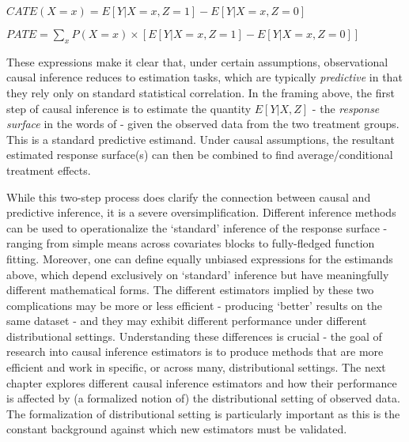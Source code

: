 \documentclass[../main.tex]{subfiles}
\begin{document}
\vspace{\baselineskip}
\begin{adjustwidth}{0.5in}{0.0in}
 \( CATE \left( X=x \right)  = E \left[ Y  \vert  X=x, Z=1 \right]  - E \left[ Y  \vert  X=x, Z=0 \right]  \) \par

\end{adjustwidth}


\vspace{\baselineskip}
\begin{adjustwidth}{0.5in}{0.0in}
 \( PATE =  \sum _{x}^{}P \left( X=x \right)   \times  \left[  E \left[ Y  \vert  X=x, Z=1 \right]  - E \left[ Y  \vert  X=x, Z=0 \right]   \right] _{} \) \par

\end{adjustwidth}


\vspace{\baselineskip}
These expressions make it clear that, under certain assumptions, observational causal inference reduces to estimation tasks, which are typically \textit{predictive }in that they rely only on standard statistical correlation. In the framing above, the first step of causal inference is to estimate the quantity \( E \left[ Y  \vert  X, Z \right]  \)  - the \textit{response surface} in the words of \textcite{Hill2011BayesianInference} - given the observed data from the two treatment groups. This is a standard predictive estimand. Under causal assumptions, the resultant estimated response surface(s) can then be combined to find average/conditional treatment effects.\par


\vspace{\baselineskip}
While this two-step process does clarify the connection between causal and predictive inference, it is a severe oversimplification. Different inference methods can be used to operationalize the ‘standard’ inference of the response surface - ranging from simple means across covariates blocks to fully-fledged function fitting. Moreover, one can define equally unbiased expressions for the estimands above, which depend exclusively on ‘standard’ inference but have meaningfully different mathematical forms. The different estimators implied by these two complications may be more or less efficient - producing ‘better’ results on the same dataset - and they may exhibit different performance under different distributional settings. Understanding these differences is crucial - the goal of research into causal inference estimators is to produce methods that are more efficient and work in specific, or across many, distributional settings. The next chapter explores different causal inference estimators and how their performance is affected by (a formalized notion of) the distributional setting of observed data. The formalization of distributional setting is particularly important as this is the constant background against which new estimators must be validated.\par
\end{document}
